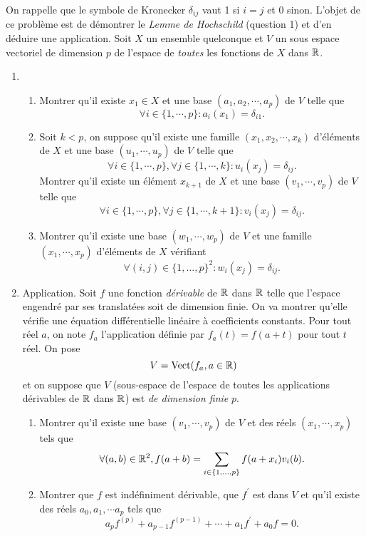 On rappelle que le symbole de Kronecker $\delta_{ij}$ vaut 1 si $i=j$ et 0 sinon.\newline
L'objet de ce problème est de démontrer le \emph{Lemme de Hochschild} (question 1) et d'en déduire une application.\newline
Soit $X$ un ensemble quelconque et $V$ un sous espace vectoriel de dimension $p$ de l'espace de \emph{toutes} les fonctions de $X$
dans $\mathbb{R}$.

\begin{enumerate}
\item
\begin{enumerate}
  \item Montrer qu'il existe $x_1 \in X$ et une base $(a_1,a_2,\cdots,a_p)$ de $V$ telle que
\[
\forall i \in \{1,\cdots,p\} : a_i(x_1)=\delta_{i1}.
\]

\item Soit $k<p$, on suppose qu'il existe une famille $(x_1,x_2,\cdots,x_k)$ d'{\'e}l{\'e}ments de $X$ et une  base $(u_1,\cdots,u_p)$ de $V$ telle que
  \[
  \forall i \in \{1,\cdots,p\} , \forall j \in \{1,\cdots,k\} : u_i(x_j)=\delta_{ij}.
  \]
Montrer qu'il existe un {\'e}l{\'e}ment $x_{k+1}$ de $X$ et une base $(v_1,\cdots,v_p)$ de $V$ telle que
  \[
  \forall i \in \{1,\cdots,p\} , \forall j \in \{1,\cdots,k+1\} : v_i(x_j)=\delta_{ij}.
  \]

\item  Montrer qu'il existe une base $(w_1,\cdots ,w_p)$ de $V$ et une famille $(x_1,\cdots ,x_p)$ d'{\'e}l{\'e}ments de $X$ vérifiant
\begin{displaymath}
\forall (i,j)\in \{ 1,\ldots ,p\}^2 : w_i(x_j)=\delta _{ij}.
\end{displaymath}
\end{enumerate}

\item  Application. Soit $f$ une fonction \emph{d{\'e}rivable} de $\mathbb{R}$ dans $\mathbb{R}$ telle que l'espace engendré par ses translatées soit de dimension finie. On va montrer qu'elle vérifie une équation différentielle linéaire à coefficients constants.\newline
Pour tout r{\'e}el $a$, on note $f_a$ l'application définie par $f_a(t)=f(a+t)$ pour tout $t$ r{\'e}el. On pose
 \[V = \mathop{\mathrm{Vect}}(f_a,a\in \mathbb{R})\]
et on suppose que $V$ (sous-espace de l'espace de toutes les applications dérivables de $\mathbb{R}$ dans $\mathbb{R}$) est \emph{de dimension finie }$p$.

\begin{enumerate}
\item  Montrer qu'il existe une base $(v_1,\cdots ,v_p)$ de $V$ et des
r{\'e}els $(x_1,\cdots ,x_p)$ tels que
\[
\forall (a,b)\in \mathbb{R}^2,f(a+b)=\sum_{i\in \left\{ 1,\ldots
,p\right\} }f(a+x_i)v_i(b).
\]

\item  Montrer que $f$ est ind{\'e}finiment d{\'e}rivable, que $%
f^{\prime }$ est dans $V$ et qu'il existe des r{\'e}els $a_0,a_1,\cdots a_p$
tels que
\[
a_pf^{(p)}+a_{p-1}f^{(p-1)}+\cdots +a_1f^{\prime }+a_0f=0.
\]
\end{enumerate}
\end{enumerate}
